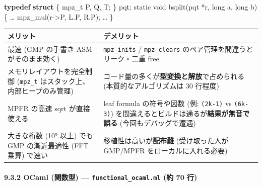 \documentclass[
]{ltjsarticle}
\newenvironment{Shaded}{}{}
\newcommand{\DataTypeTok}[1]{\textcolor[rgb]{0.56,0.13,0.00}{#1}}
\newcommand{\KeywordTok}[1]{\textcolor[rgb]{0.00,0.44,0.13}{\textbf{#1}}}
\newcommand{\NormalTok}[1]{#1}
\newcommand{\OperatorTok}[1]{\textcolor[rgb]{0.40,0.40,0.40}{#1}}
\newcounter{none} %
\begin{document}
\begin{Shaded}
\begin{Highlighting}[]
\KeywordTok{typedef} \KeywordTok{struct} \OperatorTok{\{}\NormalTok{ mpz\_t P}\OperatorTok{,}\NormalTok{ Q}\OperatorTok{,}\NormalTok{ T}\OperatorTok{;} \OperatorTok{\}}\NormalTok{ pqt}\OperatorTok{;}
\DataTypeTok{static} \DataTypeTok{void}\NormalTok{ bsplit}\OperatorTok{(}\NormalTok{pqt }\OperatorTok{*}\NormalTok{r}\OperatorTok{,} \DataTypeTok{long}\NormalTok{ a}\OperatorTok{,} \DataTypeTok{long}\NormalTok{ b}\OperatorTok{)} \OperatorTok{\{}\NormalTok{ … mpz\_mul}\OperatorTok{(}\NormalTok{r}\OperatorTok{{-}\textgreater{}}\NormalTok{P}\OperatorTok{,}\NormalTok{ L}\OperatorTok{.}\NormalTok{P}\OperatorTok{,}\NormalTok{ R}\OperatorTok{.}\NormalTok{P}\OperatorTok{);}\NormalTok{ … }\OperatorTok{\}}
\end{Highlighting}
\end{Shaded}

{\def\LTcaptype{none} %
\begin{longtable}[]{@{}
  >{\raggedright\arraybackslash}p{}
  >{\raggedright\arraybackslash}p{}@{}}
\toprule\noalign{}
\begin{minipage}[b]{\linewidth}\raggedright
メリット
\end{minipage} & \begin{minipage}[b]{\linewidth}\raggedright
デメリット
\end{minipage} \\
\midrule\noalign{}
\endhead
\bottomrule\noalign{}
\endlastfoot
最速 (GMP の手書き ASM がそのまま効く) & \texttt{mpz\_inits} /
\texttt{mpz\_clears} のペア管理を間違うとリーク・二重 free \\
メモリレイアウトを完全制御 (\texttt{mpz\_t}
はスタック上、内部ヒープのみ管理) &
コード量の多くが\textbf{型変換と解放}で占められる
(本質的なアルゴリズムは 30 行程度) \\
MPFR の高速 sqrt が直接使える & leaf formula の符号や因数 (例:
\texttt{(2k-1)} vs \texttt{(6k-3)})
を間違えるとビルドは通るが\textbf{結果が無音で誤る}
(今回もデバッグで遭遇) \\
大きな桁数 (10⁹ 以上) でも GMP の漸近最適性 (FFT 乗算) で速い &
移植性は高いが\textbf{配布難} (受け取った人が GMP/MPFR
をローカルに入れる必要) \\
\end{longtable}
}

\paragraph{\texorpdfstring{9.3.2 OCaml (関数型) ---
\texttt{functional\_ocaml.ml} (約 70
行)}{9.3.2 OCaml (関数型) --- functional\_ocaml.ml (約 70 行)}}\label{ocaml-ux95a2ux6570ux578b-functional_ocaml.ml-ux7d04-70-ux884c}
\end{document}
